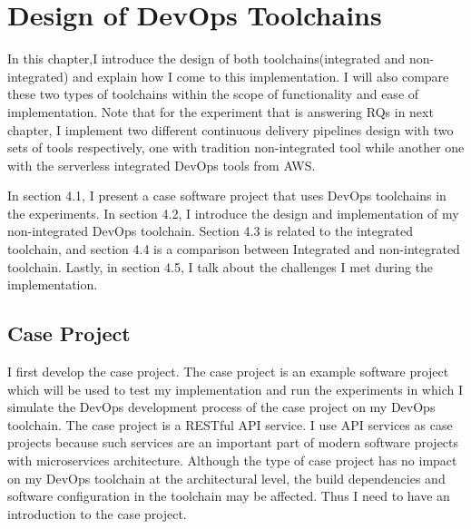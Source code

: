 \chapter{Design of DevOps Toolchains}
In this chapter,I introduce the design of both toolchains(integrated and non-integrated) and explain how I come to this implementation. I will also compare these two types of toolchains within the scope of functionality and ease of implementation.
Note that for the experiment that is answering RQs in next chapter, I implement two different continuous delivery pipelines design with two sets of tools respectively, one with tradition non-integrated tool while another one with the serverless integrated DevOps tools from AWS.
\par
In section 4.1, I present a case software project that uses DevOps toolchains in the experiments. In section 4.2, I introduce the design and implementation of my non-integrated DevOps toolchain. Section 4.3 is related to the integrated toolchain, and section 4.4 is a comparison between Integrated and non-integrated toolchain. Lastly, in section 4.5, I talk about the challenges I met during the implementation.
\section{Case Project}
I first develop the case project. The case project is an example software project which will be used to test my implementation and run the experiments in which I simulate the DevOps development process of the case project on my DevOps toolchain. 
The case project is a RESTful API service. I use API services as case projects because such services are an important part of modern software projects with microservices architecture. 
Although the type of case project has no impact on my DevOps toolchain at the architectural level, the build dependencies and software configuration in the toolchain may be affected. Thus I need to have an introduction to the case project.
